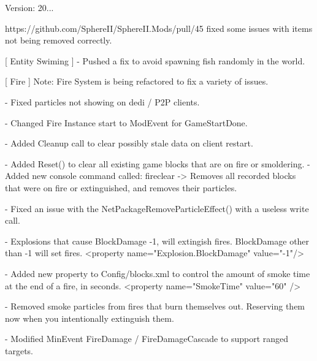 Version\+: 20... \begin{DoxyVerb}

    https://github.com/SphereII/SphereII.Mods/pull/45
        fixed some issues with items not being removed correctly.

[ Entity Swiming ]
    - Pushed a fix to avoid spawning fish randomly in the world.

[ Fire ]
    Note: Fire System is being refactored to fix a variety of issues.

    - Fixed particles not showing on dedi / P2P clients.

    - Changed Fire Instance start to ModEvent for GameStartDone.

    - Added Cleanup call to clear possibly stale data on client restart.

    - Added Reset() to clear all existing game blocks that are on fire or smoldering.
    - Added new console command called:  fireclear
        -> Removes all recorded blocks that were on fire or extinguished, and removes their particles.

    - Fixed an issue with the NetPackageRemoveParticleEffect() with a useless write call.

    - Explosions that cause BlockDamage -1, will extingish fires. BlockDamage other than -1 will set fires.
        <property name="Explosion.BlockDamage" value="-1"/>

    - Added new property to Config/blocks.xml to control the amount of smoke time at the end of a fire, in seconds.
        <property name="SmokeTime" value="60" />

    - Removed smoke particles from fires that burn themselves out. Reserving them now when you intentionally extinguish them.

    - Modified MinEvent FireDamage / FireDamageCascade to support ranged targets.
\end{DoxyVerb}
